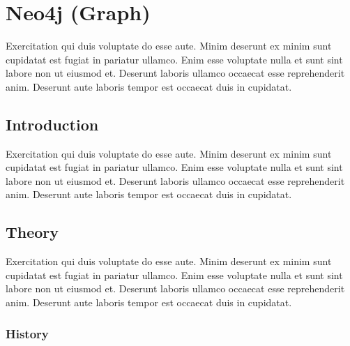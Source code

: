 
\chapter{Neo4j (Graph)} \label{ch:neo4j}

Exercitation qui duis voluptate do esse aute. Minim deserunt ex minim sunt cupidatat est fugiat in pariatur ullamco. Enim esse voluptate nulla et sunt sint labore non ut eiusmod et. Deserunt laboris ullamco occaecat esse reprehenderit anim. Deserunt aute laboris tempor est occaecat duis in cupidatat.

\section{Introduction} \label{sec:introductionNeo4j}

Exercitation qui duis voluptate do esse aute. Minim deserunt ex minim sunt cupidatat est fugiat in pariatur ullamco. Enim esse voluptate nulla et sunt sint labore non ut eiusmod et. Deserunt laboris ullamco occaecat esse reprehenderit anim. Deserunt aute laboris tempor est occaecat duis in cupidatat.

\section{Theory} \label{sec:theoryNeo4j}

Exercitation qui duis voluptate do esse aute. Minim deserunt ex minim sunt cupidatat est fugiat in pariatur ullamco. Enim esse voluptate nulla et sunt sint labore non ut eiusmod et. Deserunt laboris ullamco occaecat esse reprehenderit anim. Deserunt aute laboris tempor est occaecat duis in cupidatat.

\subsection{History} \label{subsec:historyNeo4j}

